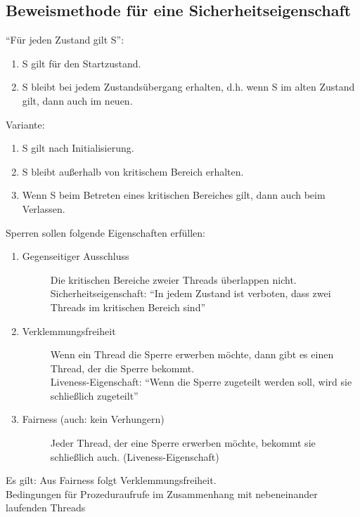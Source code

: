 \subsection*{Beweismethode für eine Sicherheitseigenschaft}
"`Für jeden Zustand gilt S"':
\begin{enumerate}
\item S gilt für den Startzustand.
\item S bleibt bei jedem Zustandsübergang erhalten, d.h. wenn S im alten Zustand gilt, dann auch im neuen.
\end{enumerate}
Variante:
\begin{enumerate}
\item S gilt nach Initialisierung.
\item S bleibt außerhalb von kritischem Bereich erhalten.
\item Wenn S beim Betreten eines kritischen Bereiches gilt, dann auch beim Verlassen.
\end{enumerate}
Sperren sollen folgende Eigenschaften erfüllen:
\begin{enumerate}
\item
	\begin{description}
		\item [Gegenseitiger Ausschluss] Die kritischen Bereiche zweier Threads überlappen nicht.\\Sicherheitseigenschaft: "`In jedem Zustand ist verboten, dass zwei Threads im kritischen Bereich sind"'
	\end{description}
\item
	\begin{description}
		\item [Verklemmungsfreiheit] Wenn ein Thread die Sperre erwerben möchte, dann gibt es einen Thread, der die Sperre bekommt.\\
		Liveness-Eigenschaft: "`Wenn die Sperre zugeteilt werden soll, wird sie schließlich zugeteilt"'
	\end{description}
\item
	\begin{description}
		\item [Fairness (auch: kein Verhungern)] Jeder Thread, der eine Sperre erwerben möchte, bekommt sie schließlich auch. (Liveness-Eigenschaft)
	\end{description}
\end{enumerate}
Es gilt: Aus Fairness folgt Verklemmungsfreiheit.
\\
Bedingungen für Prozeduraufrufe im Zusammenhang mit nebeneinander laufenden Threads
